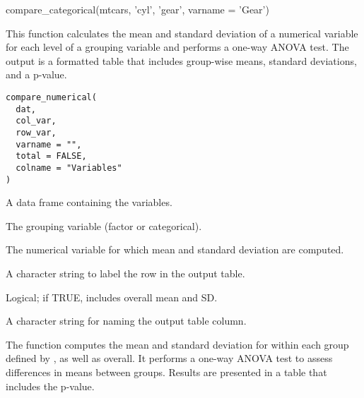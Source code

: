 \documentclass[a4paper]{book}
\begin{document}
%
\begin{Examples}
\begin{ExampleCode}
compare_categorical(mtcars, 'cyl', 'gear', varname = 'Gear')

\end{ExampleCode}
\end{Examples}
%
\begin{Description}
This function calculates the mean and standard deviation of a numerical variable for each level of a grouping variable and performs a one-way ANOVA test. The output is a formatted table that includes group-wise means, standard deviations, and a p-value.
\end{Description}
%
\begin{Usage}
\begin{verbatim}
compare_numerical(
  dat,
  col_var,
  row_var,
  varname = "",
  total = FALSE,
  colname = "Variables"
)
\end{verbatim}
\end{Usage}
%
\begin{Arguments}
\begin{ldescription}
\item[\code{dat}] A data frame containing the variables.

\item[\code{col\_var}] The grouping variable (factor or categorical).

\item[\code{row\_var}] The numerical variable for which mean and standard deviation are computed.

\item[\code{varname}] A character string to label the row in the output table.

\item[\code{total}] Logical; if TRUE, includes overall mean and SD.

\item[\code{colname}] A character string for naming the output table column.
\end{ldescription}
\end{Arguments}
%
\begin{Details}
The function computes the mean and standard deviation for  within each group defined by , as well as overall. It performs a one-way ANOVA test to assess differences in means between groups. Results are presented in a table that includes the p-value.
\end{Details}
\end{document}
